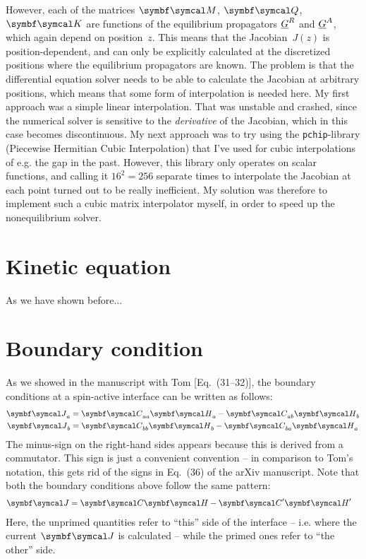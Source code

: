 However, each of the matrices $\BC{M}$, $\BC{Q}$, $\BC{K}$ are functions of the equilibrium propagators $\underline{G}^R$ and $\underline{G}^A$, which again depend on position~$z$.
This means that the Jacobian~$J(z)$ is position-dependent, and can only be explicitly calculated at the discretized positions where the equilibrium propagators are known.
The problem is that the differential equation solver needs to be able to calculate the Jacobian at arbitrary positions, which means that some form of interpolation is needed here.
My first approach was a simple linear interpolation.
That was unstable and crashed, since the numerical solver is sensitive to the \emph{derivative} of the Jacobian, which in this case becomes discontinuous.
My next approach was to try using the \texttt{pchip}-library (Piecewise Hermitian Cubic Interpolation) that I've used for cubic interpolations of e.g. the gap in the past.
However, this library only operates on scalar functions, and calling it $16^2 = 256$ separate times to interpolate the Jacobian at each point turned out to be really inefficient.
My solution was therefore to implement such a cubic matrix interpolator myself, in order to speed up the nonequilibrium solver.

\clearpage
\section{Kinetic equation}
As we have shown before...



\clearpage
\section{Boundary condition}
As we showed in the manuscript with Tom [Eq.~(31--32)], the boundary conditions at a spin-active interface can be written as follows:
\begin{align}
  \BC{J}_a &= \BC{C}_{aa} \BC{H}_a - \BC{C}_{ab} \BC{H}_b \\
  \BC{J}_b &= \BC{C}_{bb} \BC{H}_b - \BC{C}_{ba} \BC{H}_a 
\end{align}
The minus-sign on the right-hand sides appears because this is derived from a commutator. 
This sign is just a convenient convention -- in comparison to Tom's notation, this gets rid of the signs in Eq.~(36) of the arXiv manuscript.
Note that both the boundary conditions above follow the same pattern:
\begin{align}
  \BC{J} &= \BC{C} \BC{H} - \BC{C}'\BC{H}'
\end{align}
Here, the unprimed quantities refer to ``this'' side of the interface -- i.e. where the current $\BC{J}$ is calculated -- while the primed ones refer to ``the other'' side.

